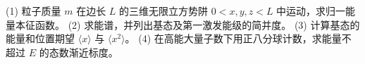 (1) 粒子质量 \(m\) 在边长 \(L\) 的三维无限立方势阱 \(0<x,y,z<L\) 中运动，求归一能量本征函数。
(2) 求能谱，并列出基态及第一激发能级的简并度。
(3) 计算基态的能量和位置期望 \(\langle x\rangle\) 与 \(\langle x^2\rangle\)。
(4) 在高能大量子数下用正八分球计数，求能量不超过 \(E\) 的态数渐近标度。
